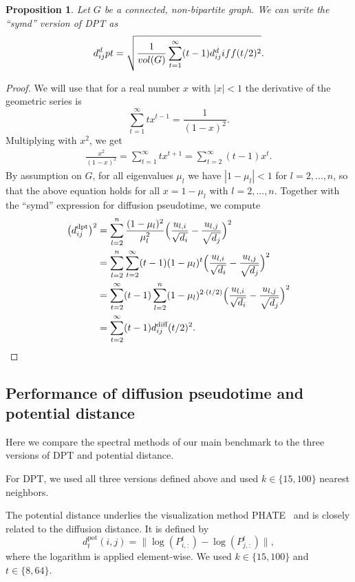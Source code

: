 \documentclass{article}
\theoremstyle{plain}
\newtheorem{proposition}[theorem]{Proposition}
\theoremstyle{definition}
\theoremstyle{remark}
\begin{document}
\begin{proposition}\label{prop:dpt_diff}
    Let $G$ be a connected, non-bipartite graph. We can write the ``symd'' version of DPT as
    \begin{equation}
        d_{ij}^\textnormal{dpt} = \sqrt{\frac{1}{\textnormal{vol}(G)}\sum_{t=1}^\infty (t-1) d_{ij}^\textnormal{diff}(t/2)^2}.
    \end{equation}
\end{proposition}
\begin{proof}
    We will use that for a real number $x$ with $|x|<1$ the derivative of the geometric series is
    $$
    \sum_{t=1}^\infty tx^{t-1} = \frac{1}{(1-x)^2}.
    $$
    Multiplying with $x^2$, we get 
    \begin{align}
        \frac{x^2}{(1-x)^2} =  \sum_{t=1}^\infty tx^{t+1} = \sum_{t=2}^\infty (t-1)x^t.
    \end{align}
    By assumption on $G$, for all eigenvalues $\mu_l$ we have $|1-\mu_l|<1$ for $l=2, \dots, n$, so that the above equation holds for all $x=1-\mu_l$ with $l=2, \dots, n$. Together with the ``symd'' expression for diffusion pseudotime, we compute
    \begin{align}
        \big(d_{ij}^\text{dpt}\big)^2 &= \sum_{l=2}^{n} \frac{(1-\mu_l)^2}{\mu_l^2} \Big(\frac{u_{l, i}}{\sqrt{d_i}} - \frac{u_{l, j}}{\sqrt{d_j}}\Big)^2 \notag \\
        &= \sum_{l=2}^{n} \sum_{t=2}^\infty (t-1) (1-\mu_l)^t  \Big(\frac{u_{l, i}}{\sqrt{d_i}} - \frac{u_{l, j}}{\sqrt{d_j}}\Big)^2 \notag \\
        &= \sum_{t=2}^\infty (t-1) \sum_{l=2}^n (1-\mu_l)^{2\cdot(t/2)} \Big(\frac{u_{l, i}}{\sqrt{d_i}} - \frac{u_{l, j}}{\sqrt{d_j}}\Big)^2 \notag \\
        &=  \sum_{t=2}^\infty (t-1) d_{ij}^\text{diff}(t/2)^2.
    \end{align}
\end{proof}

\subsection{Performance of diffusion pseudotime and potential distance}

Here we compare the spectral methods of our main benchmark to the three versions of DPT and potential distance. 

For DPT, we used all three versions defined above and used $k\in\{15, 100\}$ nearest neighbors.

The potential distance underlies the visualization method PHATE~\citep{moon2019visualizing} and is closely related to the diffusion distance. It is defined by 
$$d_t^{\text{pot}}(i, j) = \| \log(P^t_{i, :}) - \log(P^t_{j,:})\|,$$
where the logarithm is applied element-wise. We used $k\in\{15, 100\}$ and $t\in\{8, 64\}$.
\end{document}
